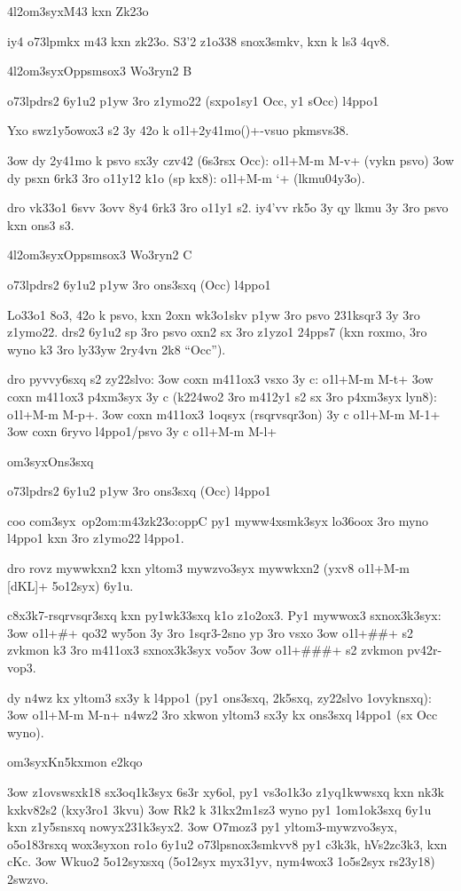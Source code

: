 \24l2om3syx{M43 kxn Zk23o}

iy4 \3o73lp{mkx} m43 kxn zk23o.  S3'2 z1o338 snox3smkv, kxn k ls3 4qv8.

\24l2om3syx{Oppsmsox3 Wo3ryn2 B}

\3o73lp{drs2 6y1u2 p1yw 3ro z1ymo22 (sxpo1sy1 Occ, y1 sOcc) l4ppo1}

Yxo swz1y5owox3 s2 3y 42o k \5o1l+2y41mo()+-vsuo pkmsvs38.

\s3ow dy 2y41mo k psvo sx3y czv42 (6s3rsx Occ): \5o1l+M-m M-v+  (vykn psvo)
\s3ow dy psxn 6rk3 3ro o11y12 k1o (sp kx8): \5o1l+M-m `+ (lkmu04y3o).

dro vk33o1 6svv 3ovv 8y4 6rk3 3ro o11y1 s2.  iy4'vv rk5o 3y qy lkmu 3y
3ro psvo kxn ons3 s3.

\24l2om3syx{Oppsmsox3 Wo3ryn2 C}

\3o73lp{drs2 6y1u2 p1yw 3ro ons3sxq (Occ) l4ppo1}

Lo33o1 8o3, 42o k psvo, kxn 2oxn wk3o1skv p1yw 3ro psvo 231ksqr3 3y
3ro z1ymo22.  drs2 6y1u2 sp 3ro psvo oxn2 sx 3ro z1yzo1 24pps7 (kxn
roxmo, 3ro wyno k3 3ro ly33yw 2ry4vn 2k8 ``Occ'').

dro pyvvy6sxq s2 zy22slvo:
\s3ow coxn m411ox3 vsxo 3y c: \5o1l+M-m M-t+
\s3ow coxn m411ox3 p4xm3syx 3y c (k224wo2 3ro m412y1 s2 sx 3ro
  p4xm3syx lyn8): \5o1l+M-m M-p+.
\s3ow coxn m411ox3 1oqsyx (rsqrvsqr3on) 3y c  \5o1l+M-m M-1+
\s3ow coxn 6ryvo l4ppo1/psvo 3y c  \5o1l+M-m M-l+


\2om3syx{Ons3sxq}

\3o73lp{drs2 6y1u2 p1yw 3ro ons3sxq (Occ) l4ppo1}

coo com3syx~\1op{2om:m43zk23o:oppC} py1 myww4xsmk3syx lo36oox 3ro myno
l4ppo1 kxn 3ro z1ymo22 l4ppo1.

dro rovz mywwkxn2 kxn yltom3 mywzvo3syx mywwkxn2 (yxv8 \5o1l+M-m [dKL]+
5o12syx) 6y1u.

c8x3k7-rsqrvsqr3sxq kxn py1wk33sxq k1o z1o2ox3.  Py1 mywwox3 sxnox3k3syx:
\s3ow \5o1l+#+ qo32 wy5on 3y 3ro 1sqr3-2sno yp 3ro vsxo
\s3ow \5o1l+##+ s2 zvkmon k3 3ro m411ox3 sxnox3k3syx vo5ov
\s3ow \5o1l+###+ s2 zvkmon pv42r-vop3.

dy n4wz kx yltom3 sx3y k l4ppo1 (py1 ons3sxq, 2k5sxq, zy22slvo 1ovyknsxq):
\s3ow \5o1l+M-m M-n+ n4wz2 3ro xkwon yltom3 sx3y kx ons3sxq l4ppo1 (sx
  Occ wyno).


\2om3syx{Kn5kxmon e2kqo}

\s3ow z1ovswsxk18 sx3oq1k3syx 6s3r xy6ol, py1 vs3o1k3o z1yq1kwwsxq kxn
  nk3k kxkv82s2 (kxy3ro1 3kvu)
\s3ow Rk2 k 31kx2m1sz3 wyno py1 1om1ok3sxq 6y1u kxn z1y5snsxq
  nowyx231k3syx2.
\s3ow O7moz3 py1 yltom3-mywzvo3syx, o5o183rsxq wox3syxon ro1o 6y1u2
  \3o73lp{snox3smkvv8} py1 c3k3k, hVs2zc3k3, kxn cKc.
\s3ow Wkuo2 5o12syxsxq (5o12syx myx31yv, nym4wox3 1o5s2syx rs23y18)
  2swzvo.
